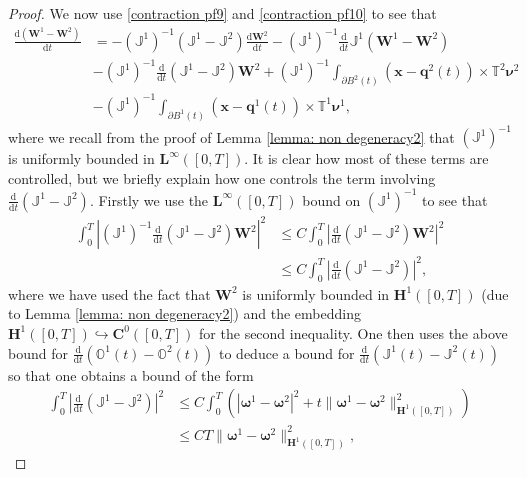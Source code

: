 \documentclass[a4paper]{amsart}
\numberwithin{equation}{section}
\theoremstyle{plain}
\newcommand{\mbf}[1]{\mathbf{#1}}
\newcommand{\mbb}[1]{\mathbb{#1}}
\begin{document}
\begin{proof}
We now use \eqref{contraction pf9} and \eqref{contraction pf10} to see that
\begin{equation}
\begin{aligned}
    \frac{\mathrm{d} (\mbf{W}^1 - \mbf{W}^2)}{\mathrm{d}t} &=  -(\mbb{J}^1)^{-1}(\mbb{J}^1 - \mbb{J}^2) \frac{\mathrm{d} \mbf{W}^2}{\mathrm{d}t} - (\mbb{J}^1)^{-1}\frac{\mathrm{d}}{\mathrm{d}t}\mbb{J}^1  (\mbf{W}^1 - \mbf{W}^2)\\
    &- (\mbb{J}^1)^{-1}\frac{\mathrm{d}}{\mathrm{d}t}(\mbb{J}^1 - \mbb{J}^2) \mbf{W}^2 + (\mbb{J}^1)^{-1} \int_{\partial B^2(t)} (\mbf{x} - \mbf{q}^2(t)) \times \mbb{T}^2 \boldsymbol{\nu}^2\\
    &- (\mbb{J}^1)^{-1}\int_{\partial B^1(t)} (\mbf{x} - \mbf{q}^1(t)) \times \mbb{T}^1 \boldsymbol{\nu}^1, 
\end{aligned}
\label{contraction pf11}
\end{equation}
where we recall from the proof of Lemma \ref{lemma: non degeneracy2} that $(\mbb{J}^1)^{-1}$ is uniformly bounded in $\mbf{L}^\infty([0,T])$.
It is clear how most of these terms are controlled, but we briefly explain how one controls the term involving $\frac{\mathrm{d}}{\mathrm{d}t}(\mbb{J}^1 - \mbb{J}^2)$.
Firstly we use the $\mbf{L}^\infty([0,T])$ bound on $(\mbb{J}^1)^{-1}$ to see that
\begin{align*}
    \int_0^T \left| (\mbb{J}^1)^{-1}\frac{\mathrm{d}}{\mathrm{d}t}(\mbb{J}^1 - \mbb{J}^2) \mbf{W}^2 \right|^2 &\leq C\int_0^T \left|\frac{\mathrm{d}}{\mathrm{d}t}(\mbb{J}^1 - \mbb{J}^2) \mbf{W}^2\right|^2\\
    &\leq C\int_0^T \left|\frac{\mathrm{d}}{\mathrm{d}t}(\mbb{J}^1 - \mbb{J}^2)\right|^2,
\end{align*}
where we have used the fact that $\mbf{W}^2$ is uniformly bounded in $\mbf{H}^1([0,T])$ (due to Lemma \ref{lemma: non degeneracy2}) and the embedding $\mbf{H}^1([0,T]) \hookrightarrow \mbf{C}^0([0,T])$ for the second inequality.
One then uses the above bound for $\frac{\mathrm{d}}{\mathrm{d}t} (\mbb{O}^1(t) - \mbb{O}^2(t))$ to deduce a bound for $\frac{\mathrm{d}}{\mathrm{d}t} (\mbb{J}^1(t) - \mbb{J}^2(t))$ so that one obtains a bound of the form
\begin{align*}
    \int_0^T \left|\frac{\mathrm{d}}{\mathrm{d}t}(\mbb{J}^1 - \mbb{J}^2)\right|^2 &\leq C \int_0^T \left(|\boldsymbol{\omega}^1 - \boldsymbol{\omega}^2|^2 + t \|\boldsymbol{\omega}^1 - \boldsymbol{\omega}^2\|_{\mbf{H}^1([0,T])}^2\right)\\
    & \leq CT \|\boldsymbol{\omega}^1 - \boldsymbol{\omega}^2\|_{\mbf{H}^1([0,T])}^2,

\end{align*}
\end{proof}
\end{document}
